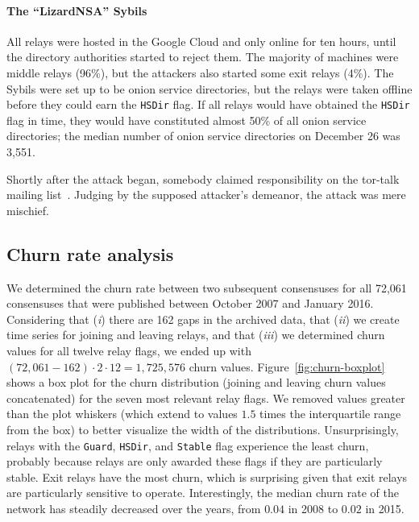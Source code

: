 \paragraph{The ``LizardNSA'' Sybils}
All relays were hosted in the Google Cloud and only online for ten hours, until
the directory authorities started to reject them.  The majority of machines were
middle relays (96\%), but the attackers also started some exit relays (4\%).
The Sybils were set up to be onion service directories, but the relays were
taken offline before they could earn the \texttt{HSDir} flag.  If all relays
would have obtained the \texttt{HSDir} flag in time, they would have constituted
almost 50\% of all onion service directories; the median number of onion
service directories on December 26 was 3,551.

Shortly after the attack began, somebody claimed responsibility on the tor-talk
mailing list~\cite{lizards}.  Judging by the supposed attacker's demeanor, the
attack was mere mischief.

\subsection{Churn rate analysis}
\label{sec:churn}
We determined the churn rate between two subsequent consensuses for all 72,061
consensuses that were published between October 2007 and January 2016.
Considering that (\emph{i}) there are 162 gaps in the archived data, that
(\emph{ii}) we create time series for joining and leaving relays, and that
(\emph{iii}) we determined churn values for all twelve relay flags, we ended up
with $(72,061 - 162) \cdot 2 \cdot 12 = 1,725,576$ churn values.
Figure~\ref{fig:churn-boxplot} shows a box plot for the churn distribution
(joining and leaving churn values concatenated) for the seven most relevant
relay flags.  We removed values greater than the plot whiskers (which extend to
values $1.5$ times the interquartile range from the box) to better visualize the
width of the distributions.  Unsurprisingly, relays with the \texttt{Guard},
\texttt{HSDir}, and \texttt{Stable} flag experience the least churn, probably
because relays are only awarded these flags if they are particularly stable.
Exit relays have the most churn, which is surprising given that exit relays are
particularly sensitive to operate.  Interestingly, the median churn rate of the
network has steadily decreased over the years, from $0.04$ in 2008 to $0.02$ in
2015.

